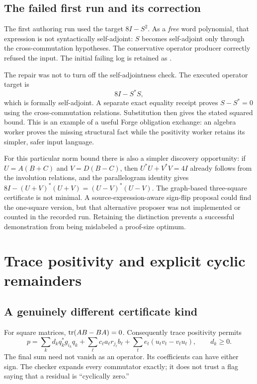 \subsection{The failed first run and its correction}

The first authoring run used the target $8I-S^2$. As a \emph{free} word polynomial,
that expression is not syntactically self-adjoint: $S$ becomes self-adjoint only
through the cross-commutation hypotheses. The conservative operator producer
correctly refused the input. The initial failing log is retained as
.

The repair was not to turn off the self-adjointness check. The executed operator
target is
\[
 8I-S^*S,
\]
which is formally self-adjoint. A separate exact equality receipt proves
$S-S^*=0$ using the cross-commutation relations. Substitution then gives the
stated squared bound. This is an example of a useful Forge obligation exchange:
an algebra worker proves the missing structural fact while the positivity
worker retains its simpler, safer input language.

For this particular norm bound there is also a simpler discovery opportunity:
if $U=A(B+C)$ and $V=D(B-C)$, then $U^*U+V^*V=4I$ already follows from the
involution relations, and the parallelogram identity gives
$8I-(U+V)^*(U+V)=(U-V)^*(U-V)$. The graph-based three-square certificate is not
minimal. A source-expression-aware sign-flip proposal could find the one-square
version, but that alternative proposer was not implemented or counted in the
recorded run. Retaining the distinction prevents a successful demonstration
from being mislabeled a proof-size optimum.

\section{Trace positivity and explicit cyclic remainders}
\label{sec:trace}

\subsection{A genuinely different certificate kind}

For square matrices, $\operatorname{tr}(AB-BA)=0$. Consequently trace positivity permits
\begin{equation}\label{eq:trace}
 p=\sum_k d_k q_k^*g_{i_k}q_k
   +\sum_\ell c_\ell a_\ell r_{j_\ell}b_\ell
   +\sum_t e_t(u_tv_t-v_tu_t),\qquad d_k\ge0.
\end{equation}
The final sum need not vanish as an operator. Its coefficients can have either
sign. The checker expands every commutator exactly; it does not trust a flag
saying that a residual is ``cyclically zero.''

